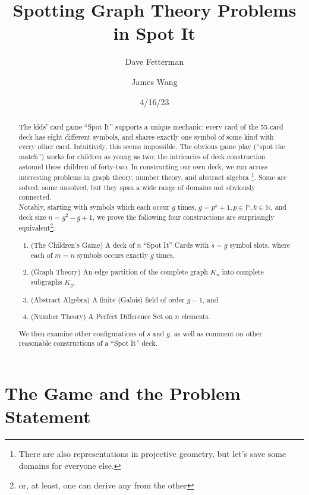 \documentclass[11pt, oneside]{article} 	%
\title{Spotting Graph Theory Problems in Spot It}
\author[1]{Dave Fetterman}
\author[2]{James Wang}
\affil[1]{Obviously Unemployed}
\affil[2]{Surprisingly Employed}
\date{4/16/23}
\begin{document}
\maketitle

\begin{abstract}

The kids' card game ``Spot It'' supports a unique mechanic: every card of the 55-card deck has eight different symbols, and shares exactly one symbol of some kind with every other card. Intuitively, this seems impossible. The obvious game play (``spot the match'') works for children as young as two; the intricacies of deck construction astound these children of forty-two. In constructing our own deck, we run across interesting problems in graph theory, number theory, and abstract algebra \footnote{There are also representations in projective geometry, but let's save some domains for everyone else.}. Some are solved, some unsolved, but they span a wide range of domains not obviously connected.
\\

Notably, starting with symbols which each occur $g$ times, $g=p^k+1, p \in \mathbb{P}, k \in \mathbb{N}$, and deck size $n = g^2-g+1$, we prove the following four constructions are surprisingly equivalent\footnote{or, at least, one can derive any from the other}:
\\
\begin{enumerate}
\item (The Children's Game) A deck of $n$ ``Spot It'' Cards with $s=g$ symbol slots, where each of $m = n$ symbols occurs exactly $g$ times,
\item (Graph Theory) An edge partition of the complete graph $K_n$ into complete subgraphs $K_g$,
\item (Abstract Algebra) A finite (Galois) field of order $g-1$, and
\item (Number Theory) A Perfect Difference Set\cite{1} on $n$ elements.
\end{enumerate} 
 
We then examine other configurations of $s$ and $g$, as well as comment on other reasonable constructions of a ``Spot It'' deck.

\end{abstract}

\section{The Game and the Problem Statement}
\end{document}
